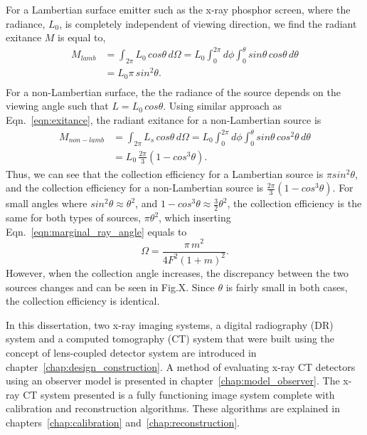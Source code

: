 For a Lambertian surface emitter such as the x-ray phosphor screen, where the radiance, $L_0$, is completely independent of viewing direction, we find the radiant exitance $M$ is equal to,
%
\begin{equation}
\begin{aligned}
M_{lamb} & = \int_{2\pi} L_0 \, cos \theta \, d\Omega = L_0 \int_0^{2 \pi} d\phi \int_0^{\theta} sin \theta \, cos \theta \, d\theta \\
  & = L_0 \pi \, sin^2 \theta. \\
\label{eqn:exitance}
\end{aligned}
\end{equation}
%
For a non-Lambertian surface, the the radiance of the source depends on the viewing angle such that $L = L_0 \, cos \theta $.  Using similar approach as Eqn.~\ref{eqn:exitance}, the radiant exitance for a non-Lambertian source is
%
\begin{equation}
\begin{aligned}
M_{non-lamb} & = \int_{2 \pi} L_s \, cos\theta \, d\Omega = L_0 \int_0^{2 \pi} d\phi \int_0^{\theta} sin\theta \, cos^2 \theta \, d\theta \\
    & = L_0 \, \frac{2 \pi}{3} (1 - cos^3 \theta ).
\end{aligned}
\end{equation}
%
Thus, we can see that the collection efficiency for a Lambertian source is $\pi sin^2 \theta$, and the collection efficiency for a non-Lambertian source is $\frac{2 \pi}{3} (1-cos^3 \theta)$.  For small angles where $sin^2 \theta \approx \theta^2$, and $1 - cos^3 \theta \approx \frac{3}{2}\theta^2$, the collection efficiency is the same for both types of sources, $\pi \theta^2$, which inserting Eqn.~\ref{eqn:marginal_ray_angle} equals to
\begin{equation}
\Omega = \frac{\pi \, m^2}{4 F^2 (1 + m)^2}.
\end{equation}
However, when the collection angle increases, the discrepancy between the two sources changes and can be seen in Fig.X.  Since $\theta$ is fairly small in both cases, the collection efficiency is identical.

In this dissertation, two x-ray imaging systems, a digital radiography (DR) system and a computed tomography (CT) system that were built using the concept of lens-coupled detector system are introduced in chapter~\ref{chap:design_construction}.  A method of evaluating x-ray CT detectors using an observer model is presented in chapter~\ref{chap:model_observer}.   The x-ray CT system presented is a fully functioning image system complete with calibration and reconstruction algorithms.  These algorithms are explained in chapters~\ref{chap:calibration} and~\ref{chap:reconstruction}.

